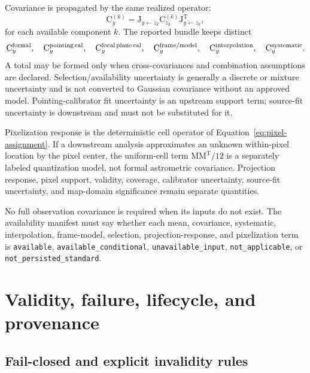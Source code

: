 \documentclass[11pt]{article}
\renewcommand{\mathsf}[1]{\mathrm{#1}}
\newcommand{\T}{\mathsf{T}}
\newcommand{\NA}{\texttt{not\_applicable}}
\begin{document}
Covariance is propagated by the same realized operator:
\begin{equation}
 \mathsf C_y^{(k)}=\mathsf J_{y\leftarrow z_k}
 \mathsf C_{z_k}^{(k)}\mathsf J_{y\leftarrow z_k}^{\T},
 \label{eq:cov-component}
\end{equation}
for each available component $k$.  The reported bundle keeps distinct
\begin{equation}
 \mathsf C_y^{\rm formal},\quad
 \mathsf C_y^{\rm pointing\,cal},\quad
 \mathsf C_y^{\rm focal\,plane\,cal},\quad
 \mathsf C_y^{\rm frame/model},\quad
 \mathsf C_y^{\rm interpolation},\quad
 \mathsf C_y^{\rm systematic}.
 \label{eq:cov-total}
\end{equation}
A total may be formed only when cross-covariances and combination assumptions
are declared.  Selection/availability uncertainty is generally a discrete or
mixture uncertainty and is not converted to Gaussian covariance without an
approved model.  Pointing-calibrator fit uncertainty is an upstream support
term; source-fit uncertainty is downstream and must not be substituted for it.

Pixelization response is the deterministic cell operator of
Equation~\eqref{eq:pixel-assignment}.  If a downstream analysis approximates
an unknown within-pixel location by the pixel center, the uniform-cell term
$\mathsf M\mathsf M^\T/12$ is a separately labeled quantization model, not
formal astrometric covariance.  Projection response, pixel support, validity,
coverage, calibrator uncertainty, source-fit uncertainty, and map-domain
significance remain separate quantities.

No full observation covariance is required when its inputs do not exist.
The availability manifest must say whether each mean, covariance, systematic,
interpolation, frame-model, selection, projection-response, and pixelization
term is \texttt{available}, \texttt{available\_conditional},
\texttt{unavailable\_input}, \NA, or \texttt{not\_persisted\_standard}.

\section{Validity, failure, lifecycle, and provenance}

\subsection{Fail-closed and explicit invalidity rules}
\end{document}

